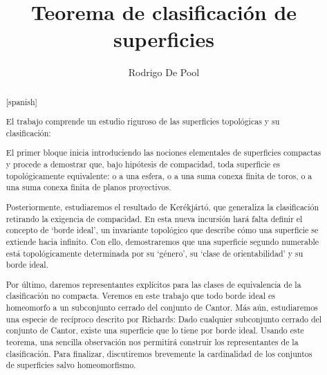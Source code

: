 \documentclass[a4paper,11pt,spanish, twoside, leqno]{tfg-uam}
\title{Teorema de clasificación de superficies}
\author{Rodrigo De Pool}
\theoremstyle{definition}
\begin{document}
\begin{abstract}[spanish]

El trabajo comprende un estudio riguroso de las superficies topológicas y su clasificación:

El primer bloque inicia introduciendo las nociones elementales de superficies compactas y procede a demostrar que, bajo hipótesis de compacidad, toda superficie es topológicamente equivalente: o a una esfera, o a una suma conexa finita de toros, o a una suma conexa finita de planos proyectivos. 

Posteriormente, estudiaremos el resultado de Kerékjártó, que generaliza la clasificación retirando la exigencia de compacidad. En esta nueva incursión hará falta definir el concepto de `borde ideal', un invariante topológico que describe cómo una superficie se extiende hacia infinito. Con ello, demostraremos que una superficie segundo numerable está topológicamente determinada por su `género', su `clase de orientabilidad' y su borde ideal. 

Por último, daremos representantes explícitos para las clases de equivalencia de la clasificación no compacta. Veremos en este trabajo que todo borde ideal es homeomorfo a un subconjunto cerrado del conjunto de Cantor. Más aún, estudiaremos una especie de recíproco descrito por Richards: Dado cualquier subconjunto cerrado del conjunto de Cantor, existe una superficie que lo tiene por borde ideal. Usando este teorema, una sencilla observación nos permitirá construir los representantes de la clasificación. Para finalizar, discutiremos brevemente la cardinalidad de los conjuntos de superficies salvo homeomorfismo.
\end{abstract}
\end{document}
